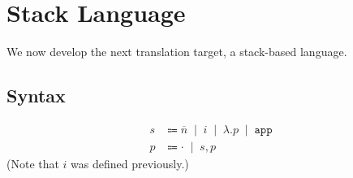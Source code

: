 \documentclass[12pt]{article}
\newcommand{\alt}{\;\; | \;\;}
\newcommand{\defi}{\Coloneqq}
\newcommand{\nil}{\cdot}
\newcommand{\h}[1]{\hat{#1}}
\renewcommand{\rule}{\textsc}
\newcommand{\sg}{\sigma}
\renewcommand{\phi}{\varphi}
\newcommand{\De}{\Delta}
\newcommand{\E}{\mathcal{E}}
\newcommand{\B}{\mathcal{B}}
\newcommand{\C}{\mathcal{C}}
\newcommand{\D}{\mathcal{D}}
\newcommand{\T}{\mathcal{T}}
\newcommand{\n}[1]{\overline{#1}}
\newcommand{\lam}[2]{\lambda #1. #2}
\newcommand{\app}{\;}
\newcommand{\sub}[3]{#1[#2/#3]}
\newcommand{\subs}[2]{#1[#2]}
\newcommand{\wo}{\backslash}
\newcommand{\sapp}{\mathtt{app}}
\newcommand{\ninf}[1]{\AxiomC{#1}}
\newcommand{\uinf}[1]{\UnaryInfC{#1}}
\newcommand{\binf}[1]{\BinaryInfC{#1}}
\newcommand{\tinf}[1]{\TrinaryInfC{#1}}
\newcommand{\prem}[2]{\noLine \ninf{$#1$} \uinf{#2}}
\newcommand{\tra}[3]{\ensuremath{#1 \vdash #2 \rhd #3}}
\newcommand{\ev}[2]{\ensuremath{#1 \downarrow #2}}
\newcommand{\hev}[3]{\ensuremath{#1 \vdash #2 \Downarrow #3}}
\newcommand{\cor}[2]{\ensuremath{#1 \rightsquigarrow #2}}
\newcommand{\comp}[3]{\ensuremath{#1 \stackrel{#2}{\rightsquigarrow} #3}}
\newcommand{\e}{e} %
\renewcommand{\c}{c} %
\renewcommand{\b}{b} %
\renewcommand{\v}{v} %
\newcommand{\s}{s}
\renewcommand{\ss}{p} %
\renewcommand{\h}{h}
\newenvironment{proof}[1][Proof]{
\paragraph{#1}
}{
\begin{flushright}
$\blacksquare$
\end{flushright}
}
\begin{document}
%
%
%
%
%
%

\section*{Stack Language}

We now develop the next translation target, a stack-based language.

\subsection*{Syntax}
\begin{align*}
  \s &\defi \n{n} \alt i \alt \lam{}{\ss} \alt \sapp \\
  \ss &\defi \nil \alt \s, \ss
\end{align*}
(Note that $i$ was defined previously.)
\end{document}
